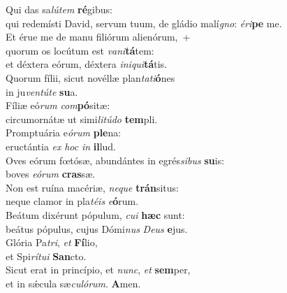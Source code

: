 \evenverse Qui das sa\textit{lú}\textit{tem} \textbf{ré}gibus:~\*\\
\evenverse qui redemísti David, servum tuum, de gládio malí\textit{gno}: \textit{é}\textit{ri}\textbf{pe} me.\\
\oddverse Et érue me de manu filiórum alienórum,~+\\
\oddverse  quorum os locútum est \textit{va}\textit{ni}\textbf{tá}tem:~\*\\
\oddverse et déxtera eórum, déxtera \textit{i}\textit{ni}\textit{qui}\textbf{tá}tis.\\
\evenverse Quorum fílii, sicut novéllæ plan\textit{ta}\textit{ti}\textbf{ó}nes~\*\\
\evenverse in ju\textit{ven}\textit{tú}\textit{te} \textbf{su}a.\\
\oddverse Fíliæ eó\textit{rum} \textit{com}\textbf{pó}sitæ:~\*\\
\oddverse circumornátæ ut simi\textit{li}\textit{tú}\textit{do} \textbf{tem}pli.\\
\evenverse Promptuária e\textit{ó}\textit{rum} \textbf{ple}na:~\*\\
\evenverse eructántia \textit{ex} \textit{hoc} \textit{in} \textbf{il}lud.\\
\oddverse Oves eórum fœtósæ, abundántes in egrés\textit{si}\textit{bus} \textbf{su}is:~\*\\
\oddverse boves \textit{e}\textit{ó}\textit{rum} \textbf{cras}sæ.\\
\evenverse Non est ruína macériæ, \textit{ne}\textit{que} \textbf{trán}situs:~\*\\
\evenverse neque clamor in pla\textit{té}\textit{is} \textit{e}\textbf{ó}rum.\\
\oddverse Beátum dixérunt pópulum, \textit{cu}\textit{i} \textbf{hæc} sunt:~\*\\
\oddverse beátus pópulus, cujus Dómi\textit{nus} \textit{De}\textit{us} \textbf{e}jus.\\
\evenverse Glória Pa\textit{tri}, \textit{et} \textbf{Fí}lio,~\*\\
\evenverse et Spi\textit{rí}\textit{tu}\textit{i} \textbf{San}cto.\\
\oddverse Sicut erat in princípio, et \textit{nunc}, \textit{et} \textbf{sem}per,~\*\\
\oddverse et in sǽcula sæ\textit{cu}\textit{ló}\textit{rum}. \textbf{A}men.\\
